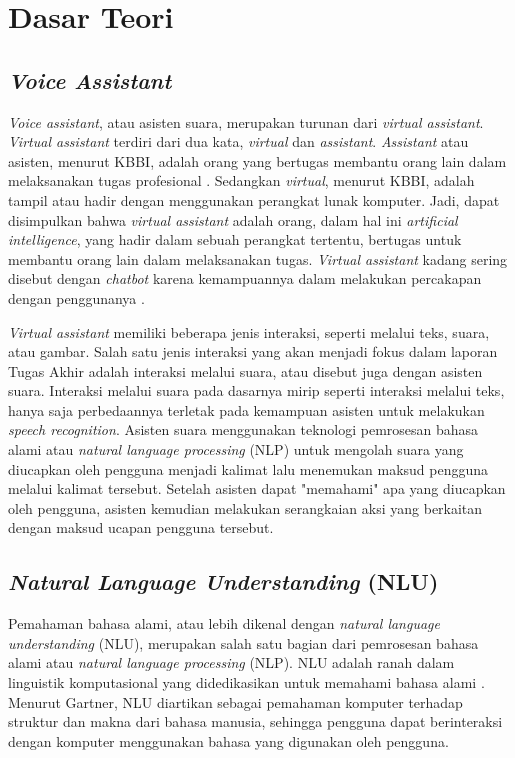 \chapter{Dasar Teori}

\section{\textit{Voice Assistant}}

\textit{Voice assistant}, atau asisten suara, merupakan turunan dari \textit{virtual assistant}. \textit{Virtual assistant} terdiri dari dua kata, \textit{virtual} dan \textit{assistant}. \textit{Assistant} atau asisten, menurut KBBI, adalah orang yang bertugas membantu orang lain dalam melaksanakan tugas profesional \parencite{kbbi}. Sedangkan \textit{virtual}, menurut KBBI, adalah tampil atau hadir dengan menggunakan perangkat lunak komputer. Jadi, dapat disimpulkan bahwa \textit{virtual assistant} adalah orang, dalam hal ini \textit{artificial intelligence}, yang hadir dalam sebuah perangkat tertentu, bertugas untuk membantu orang lain dalam melaksanakan tugas. \textit{Virtual assistant} kadang sering disebut dengan \textit{chatbot} karena kemampuannya dalam melakukan percakapan dengan penggunanya \parencite{tech2005imbot}.

\textit{Virtual assistant} memiliki beberapa jenis interaksi, seperti melalui teks, suara, atau gambar. Salah satu jenis interaksi yang akan menjadi fokus dalam laporan Tugas Akhir adalah interaksi melalui suara, atau disebut juga dengan asisten suara. Interaksi melalui suara pada dasarnya mirip seperti interaksi melalui teks, hanya saja perbedaannya terletak pada kemampuan asisten untuk melakukan \textit{speech recognition}. Asisten suara menggunakan teknologi pemrosesan bahasa alami atau \textit{natural language processing} (NLP) untuk mengolah suara yang diucapkan oleh pengguna menjadi kalimat lalu menemukan maksud pengguna melalui kalimat tersebut. Setelah asisten dapat "memahami" apa yang diucapkan oleh pengguna, asisten kemudian melakukan serangkaian aksi yang berkaitan dengan maksud ucapan pengguna tersebut.

\section{\textit{Natural Language Understanding} (NLU)}

Pemahaman bahasa alami, atau lebih dikenal dengan \textit{natural language understanding} (NLU), merupakan salah satu bagian dari pemrosesan bahasa alami atau \textit{natural language processing} (NLP). NLU adalah ranah dalam linguistik komputasional yang didedikasikan untuk memahami bahasa alami \parencite{harris2004voice}. Menurut Gartner, NLU diartikan sebagai pemahaman komputer terhadap struktur dan makna dari bahasa manusia, sehingga pengguna dapat berinteraksi dengan komputer menggunakan bahasa yang digunakan oleh pengguna.


